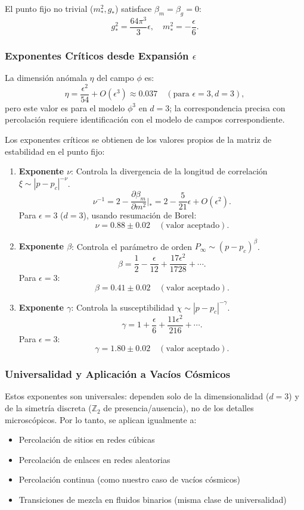 \documentclass[12pt, a4paper]{article}
\theoremstyle{plain}
\theoremstyle{definition}
\begin{document}
El punto fijo no trivial ($m_*^2, g_*$) satisface $\beta_m = \beta_g = 0$:
\[
g_*^2 = \frac{64\pi^3}{3}\epsilon, \quad m_*^2 = -\frac{\epsilon}{6}.
\]

\subsubsection{Exponentes Críticos desde Expansión $\epsilon$}

La dimensión anómala $\eta$ del campo $\phi$ es:
\[
\eta = \frac{\epsilon^2}{54} + O(\epsilon^3) \approx 0.037 \quad (\text{para } \epsilon=3, d=3),
\]
pero este valor es para el modelo $\phi^3$ en $d=3$; la correspondencia precisa con percolación requiere identificación con el modelo de campos correspondiente.

Los exponentes críticos se obtienen de los valores propios de la matriz de estabilidad en el punto fijo:

\begin{enumerate}
    \item \textbf{Exponente $\nu$}: Controla la divergencia de la longitud de correlación $\xi \sim |p-p_c|^{-\nu}$.
    \[
    \nu^{-1} = 2 - \frac{\partial\beta_m}{\partial m^2}\Big|_{*} = 2 - \frac{5}{21}\epsilon + O(\epsilon^2).
    \]
    Para $\epsilon = 3$ ($d=3$), usando resumación de Borel:
    \[
    \nu = 0.88 \pm 0.02 \quad (\text{valor aceptado}).
    \]
    
    \item \textbf{Exponente $\beta$}: Controla el parámetro de orden $P_\infty \sim (p-p_c)^\beta$.
    \[
    \beta = \frac{1}{2} - \frac{\epsilon}{12} + \frac{17\epsilon^2}{1728} + \cdots.
    \]
    Para $\epsilon=3$:
    \[
    \beta = 0.41 \pm 0.02 \quad (\text{valor aceptado}).
    \]
    
    \item \textbf{Exponente $\gamma$}: Controla la susceptibilidad $\chi \sim |p-p_c|^{-\gamma}$.
    \[
    \gamma = 1 + \frac{\epsilon}{6} + \frac{11\epsilon^2}{216} + \cdots.
    \]
    Para $\epsilon=3$:
    \[
    \gamma = 1.80 \pm 0.02 \quad (\text{valor aceptado}).
    \]
\end{enumerate}

\subsubsection{Universalidad y Aplicación a Vacíos Cósmicos}

Estos exponentes son universales: dependen solo de la dimensionalidad ($d=3$) y de la simetría discreta ($\mathbb{Z}_2$ de presencia/ausencia), no de los detalles microscópicos. Por lo tanto, se aplican igualmente a:
\begin{itemize}
    \item Percolación de sitios en redes cúbicas
    \item Percolación de enlaces en redes aleatorias
    \item Percolación continua (como nuestro caso de vacíos cósmicos)
    \item Transiciones de mezcla en fluidos binarios (misma clase de universalidad)
\end{itemize}
\end{document}
